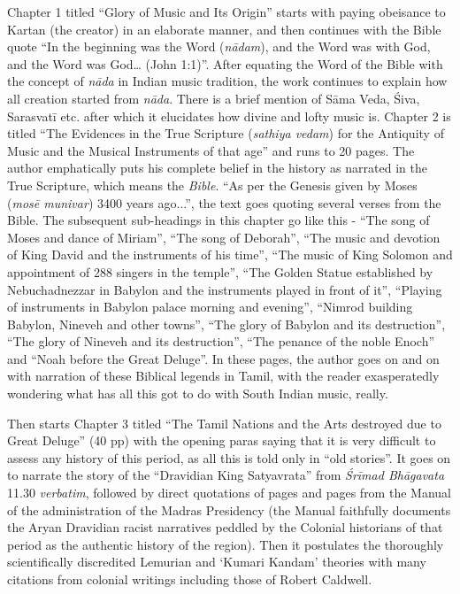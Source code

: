 Chapter 1 titled “Glory of Music and Its Origin” starts with paying obeisance to Kartan (the creator) in an elaborate manner, and then continues with the Bible quote “In the beginning was the Word (\textit{nādam}), and the Word was with God, and the Word was God… (John 1:1)”. After equating the Word of the Bible with the concept of \textit{nāda} in Indian music tradition, the work continues to explain how all creation started from \textit{nāda}. There is a brief mention of Sāma Veda, Śiva, Sarasvatī etc. after which it elucidates how divine and lofty music is. Chapter 2 is titled “The Evidences in the True Scripture (\textit{sathiya vedam}) for the Antiquity of Music and the Musical Instruments of that age” and runs to 20 pages. The author emphatically puts his complete belief in the history as narrated in the True Scripture, which means the \textit{Bible}. “As per the Genesis given by Moses (\textit{mosē munivar}) 3400 years ago...”, the text goes quoting several verses from the Bible. The subsequent sub-headings in this chapter go like this - “The song of Moses and dance of Miriam”, “The song of Deborah”, “The music and devotion of King David and the instruments of his time”, “The music of King Solomon and appointment of 288 singers in the temple”, “The Golden Statue established by Nebuchadnezzar in Babylon and the instruments played in front of it”, “Playing of instruments in Babylon palace morning and evening”, “Nimrod building Babylon, Nineveh and other towns”, “The glory of Babylon and its destruction”, “The glory of Nineveh and its destruction”, “The penance of the noble Enoch” and “Noah before the Great Deluge”. In these pages, the author goes on and on with narration of these Biblical legends in Tamil, with the reader exasperatedly wondering what has all this got to do with South Indian music, really.

Then starts Chapter 3 titled “The Tamil Nations and the Arts destroyed due to Great Deluge” (40 pp) with the opening paras saying that it is very difficult to assess any history of this period, as all this is told only in “old stories”. It goes on to narrate the story of the “Dravidian King Satyavrata” from \textit{Śrīmad Bhāgavata} 11.30 \textit{verbatim}, followed by direct quotations of pages and pages from the Manual of the administration of the Madras Presidency (the Manual faithfully documents the Aryan Dravidian racist narratives peddled by the Colonial historians of that period as the authentic history of the region). Then it postulates the thoroughly scientifically discredited Lemurian and ‘Kumari Kandam’ theories with many citations from colonial writings including those of Robert Caldwell.

